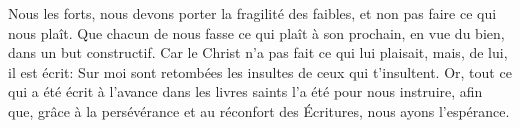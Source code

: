 Nous les forts, nous devons porter la fragilité des faibles,
	et non pas faire ce qui nous plaît.
Que chacun de nous fasse ce qui plaît à son prochain,
	en vue du bien, dans un but constructif.
Car le Christ n’a pas fait ce qui lui plaisait,
	mais, de lui, il est écrit:
	Sur moi sont retombées les insultes de ceux qui t’insultent.
Or, tout ce qui a été écrit à l’avance dans les livres saints
		l’a été pour nous instruire,
	afin que, grâce à la persévérance et au réconfort des Écritures,
	nous ayons l’espérance.
